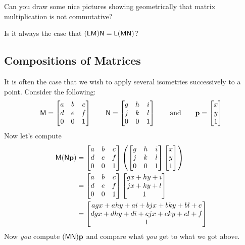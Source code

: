 \begin{question}
Can you draw some nice pictures showing geometrically that matrix
multiplication is not commutative?
\end{question}
\QM

\begin{question}
Is it always the case that $(\mathsf{L}\mathsf{M})\mathsf{N} = \mathsf{L}(\mathsf{M}\mathsf{N})$?
\end{question}
\QM




\subsection{Compositions of Matrices}

It is often the case that we wish to apply several isometries
successively to a point. Consider the following:
\[
\mathsf{M} =
\begin{bmatrix}
a & b & c\\
d & e & f \\
0 & 0 & 1
\end{bmatrix}
\qquad
\mathsf{N} =
\begin{bmatrix}
g & h & i\\
j & k & l\\
0 & 0 & 1
\end{bmatrix}
\qquad\text{and}\qquad \mathbf{p} =
\begin{bmatrix}
x \\
y \\
1
\end{bmatrix}
\]
Now let's compute 
\begin{align*}
\mathsf{M}(\mathsf{N}\mathbf{p}) &= \begin{bmatrix}
a & b & c\\
d & e & f \\
0 & 0 & 1
\end{bmatrix} 
\left(
\begin{bmatrix}
g & h & i\\
j & k & l\\
0 & 0 & 1
\end{bmatrix}
\begin{bmatrix}
x \\
y \\
1
\end{bmatrix}
\right)\\
&= 
\begin{bmatrix}
a & b & c\\
d & e & f \\
0 & 0 & 1
\end{bmatrix} 
\begin{bmatrix}
gx+hy + i\\
jx+ky +l\\
1
\end{bmatrix} \\
&=
\begin{bmatrix}
agx+ahy +ai + bjx+bky+bl+c\\
dgx+dhy+ di + ejx+eky+el+f\\
1
\end{bmatrix}
\end{align*}
Now \textit{you} compute $(\mathsf{M}\mathsf{N})\mathbf{p}$ and compare what
\textit{you} get to what we got above.



